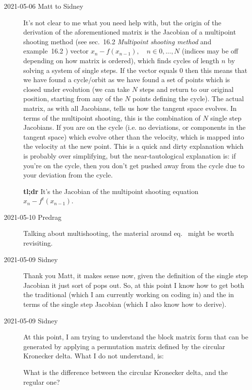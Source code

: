 \begin{description}
\item[2021-05-06 Matt to Sidney]

It's not clear to me what you need help with, but the origin of the
derivation of the aforementioned matrix is the Jacobian of a multipoint
shooting method
(see  {sec.~16.2} {\em  Multipoint shooting method}
and
 {example~16.2}%
)
vector $x_n - f(x_{n-1}),\quad n\in {0, ..., N}$ (indices
may be off depending on how matrix is ordered), which finds cycles of
length $n$ by solving a system of single steps.
If the vector equals 0 then this means that we have found a cycle/orbit as we have found a set of points which is closed under
evolution (we can take $N$ steps and return to our original position, starting from any of the $N$ points defining the cycle).
The actual matrix, as with all Jacobians, tells us how the tangent space evolves. In terms of the multipoint shooting,
this is the combination of $N$ single step Jacobians. If you are on the cycle (i.e. no deviations, or components in the tangent space)
which evolve other than the velocity, which is mapped into the velocity at the new point.
This is a quick and dirty explanation which is probably over simplifying, but
the near-tautological explanation is: if you're on the cycle, then you don't get pushed away from the cycle due to your deviation from the cycle.

\textbf{tl;dr} It's the Jacobian of the multipoint shooting equation $x_n - f^t(x_{n-1})$.

\item[2021-05-10 Predrag]
Talking about multishooting, the material around eq.~
might be worth revisiting.

\item[2021-05-09 Sidney]
Thank you Matt, it makes sense now, given the definition of the single
step Jacobian it just sort of pops out. So, at this point I know how to
get both the traditional {\jacobianOrb} (which I am currently working on
coding in) and the {\jacobianOrb} in terms of the single step Jacobian
(which I also know how to derive).

\item[2021-05-09 Sidney]
At this point, I am trying to
understand the block matrix form that can be generated by applying a
permutation matrix defined by the circular Kronecker delta. What I do not
understand, is:

What is the difference between the circular Kronecker delta, and the regular one?


\end{description}
